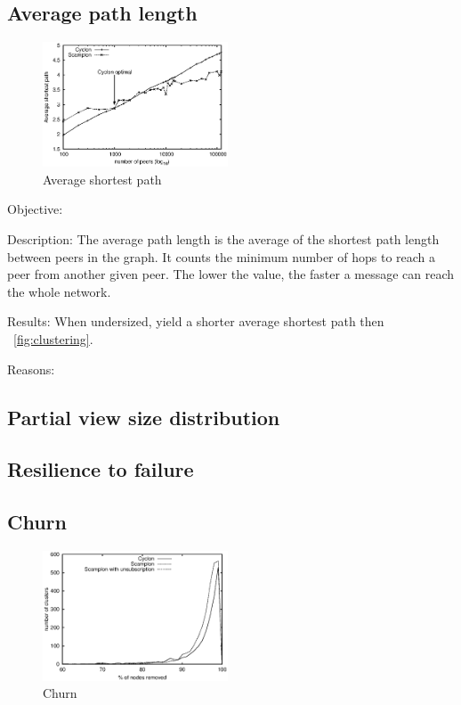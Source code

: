 \subsection{Average path length}

\begin{figure}
    \centering
    \includegraphics[width=0.49\textwidth]{img/avgpath.eps}
    \caption{Average shortest path}
    \label{fig:avgpath}
\end{figure}

\begin{asparadesc}
\item[Objective:]
\item[Description:] The average path length is the average of the shortest path
  length between peers in the graph. It counts the minimum number of hops to
  reach a peer from another given peer. The lower the value, the faster a
  message can reach the whole network.
\item[Results:]
When undersized, \CYCLON{} yield a shorter average shortest path then \SCAMPLON{}~\ref{fig:clustering}.
\item[Reasons:]
\end{asparadesc}

\subsection{Partial view size distribution}

\subsection{Resilience to failure}

\subsection{Churn}

\begin{figure}
    \centering
    \includegraphics[width=0.49\textwidth]{img/churn.eps}
    \caption{Churn}
    \label{fig:churn}
\end{figure}

